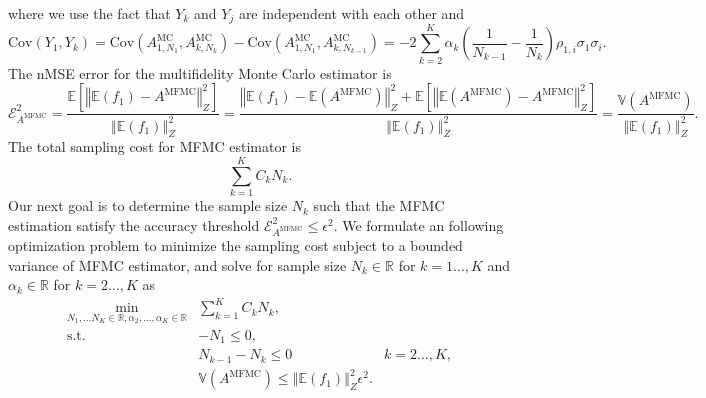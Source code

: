 \documentclass[final,3p,times,11pt]{elsarticle}
\begin{document}
where we use the fact that $Y_k$ and $Y_j$ are independent with each other and \cite[Lemma~3.2]{PeWiGu:2016}
\[
\text{Cov}(Y_1,Y_k) = \text{Cov}\left(A^{\text{MC}}_{1,N_1},A^{\text{MC}}_{k,N_k}\right) - \text{Cov}\left(A^{\text{MC}}_{1,N_1},A^{\text{MC}}_{k,N_{k-1}}\right) = -2 \sum_{k=2}^K \alpha_k \left(\frac{1}{N_{k-1}} - \frac{1}{N_k}\right)\rho_{1,i}\sigma_1\sigma_i.
\]
The nMSE error for the multifidelity Monte Carlo estimator is
\[
\mathcal{E}_{A^{\text{MFMC}}}^2=\frac{\mathbb E\left[\left\Vert\mathbb{E}(f_1)-A^{\text{MFMC}} \right\Vert_{Z}^2\right]}{\left\Vert\mathbb{E}(f_1) \right\Vert_{Z}^2} = \frac{\left\Vert\mathbb{E}(f_1)-\mathbb{E}(A^{\text{MFMC}}) \right\Vert_{Z}^2+\mathbb E\left[\left\Vert\mathbb{E}(A^{\text{MFMC}})-A^{\text{MFMC}} \right\Vert_{Z}^2\right]}{\left\Vert\mathbb{E}(f_1) \right\Vert_{Z}^2} = \frac{\mathbb{V}\left(A^{\text{MFMC}}\right)}{\left\Vert\mathbb{E}(f_1) \right\Vert_{Z}^2}.
\]
The total sampling cost for MFMC estimator is 
\[
\sum_{k=1}^K C_kN_k.
\]
Our next goal is to determine the sample size $N_k$ such that the MFMC estimation satisfy the accuracy threshold $\mathcal{E}_{A^{\text{MFMC}}}^2\le \epsilon^2$. We formulate an following optimization problem to minimize the sampling cost subject to a bounded variance of MFMC estimator, and solve for sample size $N_k\in \mathbb{R}$ for $k=1\dots, K$ and $\alpha_k\in \mathbb{R}$ for $k=2\dots, K$ as
\begin{equation}\label{eq:Optimization_pb}
    \begin{array}{lll}
    \displaystyle\min_{N_1,\ldots N_K\in \mathbb{R}, \alpha_2,\ldots,\alpha_K\in \mathbb{R}} &\sum_{k=1}^K C_kN_k,\\
       \text{s.t.} &\displaystyle -N_1\le 0, \\%
        &\displaystyle N_{k-1}-N_k\le 0 &k=2\ldots,K,\\
        &\mathbb{V}\left(A^{\text{MFMC}}\right)\le \left\Vert\mathbb{E}(f_1) \right\Vert_{Z}^2\epsilon^2.
    \end{array}
\end{equation}
\end{document}
